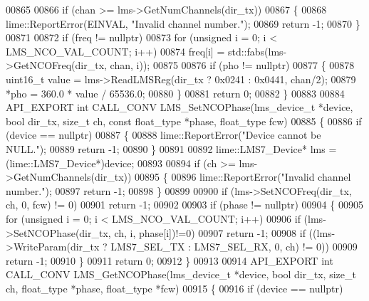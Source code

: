 \begin{DoxyCode}
00865 
00866     \textcolor{keywordflow}{if} (chan >= lms->GetNumChannels(dir\_tx))
00867     \{
00868         lime::ReportError(EINVAL, \textcolor{stringliteral}{"Invalid channel number."});
00869         \textcolor{keywordflow}{return} -1;
00870     \}
00871 
00872     \textcolor{keywordflow}{if} (freq != \textcolor{keyword}{nullptr})
00873         \textcolor{keywordflow}{for} (\textcolor{keywordtype}{unsigned} i = 0; i < LMS_NCO_VAL_COUNT; i++)
00874             freq[i] = std::fabs(lms->GetNCOFreq(dir\_tx, chan, i));
00875 
00876     \textcolor{keywordflow}{if} (pho != \textcolor{keyword}{nullptr})
00877     \{
00878         uint16\_t value = lms->ReadLMSReg(dir\_tx ? 0x0241 : 0x0441, chan/2);
00879         *pho = 360.0 * value / 65536.0;
00880     \}
00881     \textcolor{keywordflow}{return} 0;
00882 \}
00883 
00884 API_EXPORT \textcolor{keywordtype}{int} CALL_CONV LMS_SetNCOPhase(lms_device_t *device, \textcolor{keywordtype}{bool} dir_tx, \textcolor{keywordtype}{size\_t} ch, \textcolor{keyword}{const} 
      float_type *phase, float_type fcw)
00885 \{
00886     \textcolor{keywordflow}{if} (device == \textcolor{keyword}{nullptr})
00887     \{
00888         lime::ReportError(\textcolor{stringliteral}{"Device cannot be NULL."});
00889         \textcolor{keywordflow}{return} -1;
00890     \}
00891 
00892     lime::LMS7_Device* lms = (lime::LMS7_Device*)device;
00893 
00894     \textcolor{keywordflow}{if} (ch >= lms->GetNumChannels(dir\_tx))
00895     \{
00896         lime::ReportError(\textcolor{stringliteral}{"Invalid channel number."});
00897         \textcolor{keywordflow}{return} -1;
00898     \}
00899 
00900     \textcolor{keywordflow}{if} (lms->SetNCOFreq(dir\_tx, ch, 0, fcw) != 0)
00901         \textcolor{keywordflow}{return} -1;
00902 
00903     \textcolor{keywordflow}{if} (phase != \textcolor{keyword}{nullptr})
00904     \{
00905         \textcolor{keywordflow}{for} (\textcolor{keywordtype}{unsigned} i = 0; i < LMS_NCO_VAL_COUNT; i++)
00906             \textcolor{keywordflow}{if} (lms->SetNCOPhase(dir\_tx, ch, i, phase[i])!=0)
00907                 \textcolor{keywordflow}{return} -1;
00908         \textcolor{keywordflow}{if} ((lms->WriteParam(dir\_tx ? LMS7_SEL_TX : LMS7_SEL_RX, 0, ch) != 0))
00909             \textcolor{keywordflow}{return} -1;
00910     \}
00911     \textcolor{keywordflow}{return} 0;
00912 \}
00913 
00914 API_EXPORT \textcolor{keywordtype}{int} CALL_CONV LMS_GetNCOPhase(lms_device_t *device, \textcolor{keywordtype}{bool} dir_tx, \textcolor{keywordtype}{size\_t} ch, 
      float_type *phase, float_type *fcw)
00915 \{
00916     \textcolor{keywordflow}{if} (device == \textcolor{keyword}{nullptr})

\end{DoxyCode}
